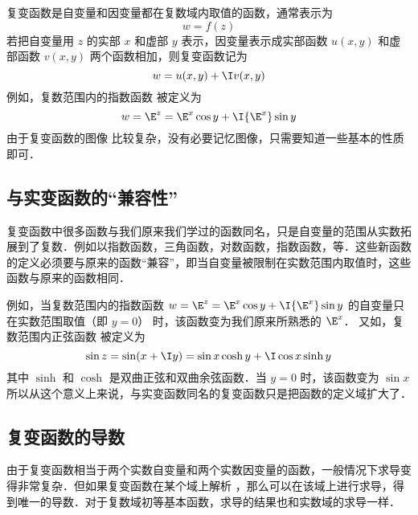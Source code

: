 
复变函数是自变量和因变量都在复数域内取值的函数，通常表示为
\begin{equation}
w = f(z)
\end{equation}
若把自变量用 $z$ 的实部 $x$ 和虚部 $y$ 表示，因变量表示成实部函数 $u(x,y)$ 和虚部函数 $v(x,y)$ 两个函数相加，则复变函数记为
\begin{equation}
w = u(x,y) + \I v(x,y)
\end{equation}
例如，复数范围内的指数函数%
被定义为
\begin{equation}
w = {\E^z} = {\E^x}\cos y + \I {\E^x}\sin y
\end{equation}
由于复变函数的图像%
比较复杂，没有必要记忆图像，只需要知道一些基本的性质即可．

\subsection{与实变函数的“兼容性”}
复变函数中很多函数与我们原来我们学过的函数同名，只是自变量的范围从实数拓展到了复数．例如以指数函数，三角函数，对数函数，指数函数，等．这些新函数的定义必须要与原来的函数“兼容”，即当自变量被限制在实数范围内取值时，这些函数与原来的函数相同．

例如，当复数范围内的指数函数%
 $w = {\E^z} = {\E^x}\cos y + \I {\E^x}\sin y$ 的自变量只在实数范围取值（即 $y = 0$） 时，该函数变为我们原来所熟悉的 $\E^x$． 
又如，复数范围内正弦函数%
被定义为
\begin{equation}
\sin z = \sin(x + \I y) = \sin x\cosh y + \I\cos x\sinh y
\end{equation}
其中 $\sinh $ 和 $\cosh $ 是双曲正弦和双曲余弦函数．当 $y = 0$ 时，该函数变为 $\sin x$ 
所以从这个意义上来说，与实变函数同名的复变函数只是把函数的定义域扩大了．

\subsection{复变函数的导数}
由于复变函数相当于两个实数自变量和两个实数因变量的函数，一般情况下求导变得非常复杂．但如果复变函数在某个域上解析%
，那么可以在该域上进行求导，得到唯一的导数．对于复数域初等基本函数，求导的结果也和实数域的求导一样．
















